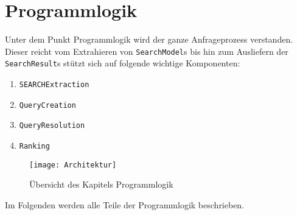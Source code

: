 
\chapter{Programmlogik}

Unter dem Punkt Programmlogik wird der ganze Anfrageprozess verstanden. Dieser reicht vom Extrahieren von \lstinline|SearchModel|s bis hin zum Ausliefern der \lstinline|SearchResult|s stützt sich auf folgende wichtige Komponenten:

\begin{enumerate}
     \item \lstinline|SEARCHExtraction|
     \item \lstinline|QueryCreation|
     \item \lstinline|QueryResolution|
     \item \lstinline|Ranking|
\end{enumerate}

\begin{figure}[htb]
  \centering
  \texttt{[image: Architektur]}
  \caption{Übersicht des Kapitels Programmlogik}
\end{figure}

Im Folgenden werden alle Teile der Programmlogik beschrieben.





%


\pagebreak



